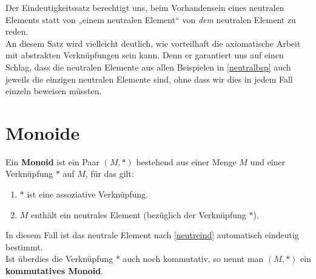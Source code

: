 \begin{bem}
Der Eindeutigkeitssatz berechtigt uns, beim Vorhandensein eines neutralen Elements statt von „einem neutralen Element“ von \emph{dem} neutralen Element zu reden. \\
An diesem Satz wird vielleicht deutlich, wie vorteilhaft die axiomatische Arbeit mit abstrakten Verknüpfungen sein kann. Denn er garantiert uns auf einen Schlag, dass die neutralen Elemente aus allen Beispielen in \cref{neutralbsp} auch jeweils die einzigen neutralen Elemente sind, ohne dass wir dies in jedem Fall einzeln beweisen müssten.
\end{bem}







\section{Monoide}



\begin{de}[Monoid]
 Ein \textbf{Monoid} ist ein Paar $(M,*)$ bestehend aus einer Menge $M$ und einer Verknüpfung $*$ auf $M$, für das gilt:
 \begin{enumerate}[(M1)]
  \item $*$ ist eine assoziative Verknüpfung.
  \item $M$ enthält ein neutrales Element (bezüglich der Verknüpfung $*$).
 \end{enumerate}
In diesem Fall ist das neutrale Element nach \cref{neutreind} automatisch eindeutig bestimmt. \\
 Ist überdies die Verknüpfung $*$ auch noch kommutativ, so nennt man $(M,*)$ ein \textbf{kommutatives Monoid}.
\end{de}





